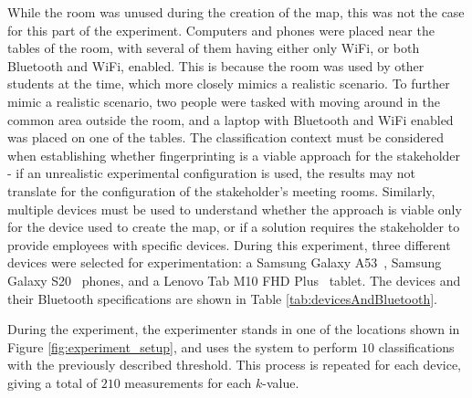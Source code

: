 While the room was unused during the creation of the map, this was not the case for this part of the experiment.
Computers and phones were placed near the tables of the room, with several of them having either only WiFi, or both Bluetooth and WiFi, enabled. 
This is because the room was used by other students at the time, which more closely mimics a realistic scenario.
To further mimic a realistic scenario, two people were tasked with moving around in the common area outside the room, and a laptop with Bluetooth and WiFi enabled was placed on one of the tables.
The classification context must be considered when establishing whether fingerprinting is a viable approach for the stakeholder - if an unrealistic experimental configuration is used, the results may not translate for the configuration of the stakeholder's meeting rooms. 
Similarly, multiple devices must be used to understand whether the approach is viable only for the device used to create the map, or if a solution requires the stakeholder to provide employees with specific devices. 
During this experiment, three different devices were selected for experimentation: a Samsung Galaxy A53~\cite{a53phone}, Samsung Galaxy S20~\cite{galaxy20phone} phones, and a Lenovo Tab M10 FHD Plus~\cite{tablet} tablet. 
The devices and their Bluetooth specifications are shown in Table \ref{tab:devicesAndBluetooth}.

\begin{table}[h!]
    \caption{The devices used in during classification and their supported Bluetooth version.}
    \label{tab:devicesAndBluetooth}
\end{table}

During the experiment, the experimenter stands in one of the locations shown in Figure \ref{fig:experiment_setup}, and uses the system to perform $10$ classifications with the previously described threshold.
This process is repeated for each device, giving a total of $210$ measurements for each $k$-value.